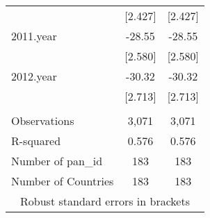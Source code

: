 \documentclass[]{article}
\begin{document}
\begin{tabular}{lcc}
 & [2.427] & [2.427] \\
2011.year & -28.55 & -28.55 \\
 & [2.580] & [2.580] \\
2012.year & -30.32 & -30.32 \\
 & [2.713] & [2.713] \\
 &  &  \\
Observations & 3,071 & 3,071 \\
R-squared & 0.576 & 0.576 \\
Number of pan\_id & 183 & 183 \\
 Number of Countries & 183 & 183 \\ \hline
\multicolumn{3}{c}{ Robust standard errors in brackets} \\
\end{tabular}
\end{document}
